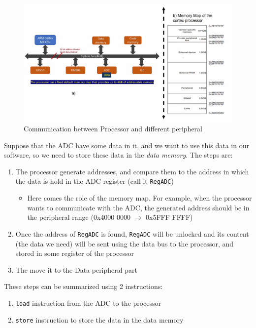 \begin{figure}[h]
\centering
\includegraphics[scale=0.55]{Figures/ARM_Cortex/memory_map_com_process_periph}
\caption{Communication between Processor and different peripheral}
\label{fig:ARM_Cortex:memory_map_com_process_periph}
\end{figure}

Suppose that the ADC have some data in it, and we want to use this data in our software, so we need to store these data in the \textit{data memory}. The steps are:

\begin{enumerate}
    \item The processor generate addresses, and compare them to the address in which the data is hold in the ADC register (call it \verb|RegADC|)

    \begin{itemize}
        \item Here comes the role of the memory map. For example, when the processor wants to communicate with the ADC, the generated address should be in the peripheral range (0x4000 0000 $\rightarrow$ 0x5FFF FFFF)
    \end{itemize}

    \item Once the address of \verb|RegADC| is found, \verb|RegADC| will be unlocked and its content (the data we need)  will be sent using the data bus to the processor, and stored in some register of the processor 

    \item The move it to the Data peripheral part
\end{enumerate}
    
These steps can be summarized using 2 instructions:

\begin{enumerate}
    \item \verb|load| instruction from the ADC to the processor

    \item \verb|store| instruction to store the data in the data memory
\end{enumerate}


